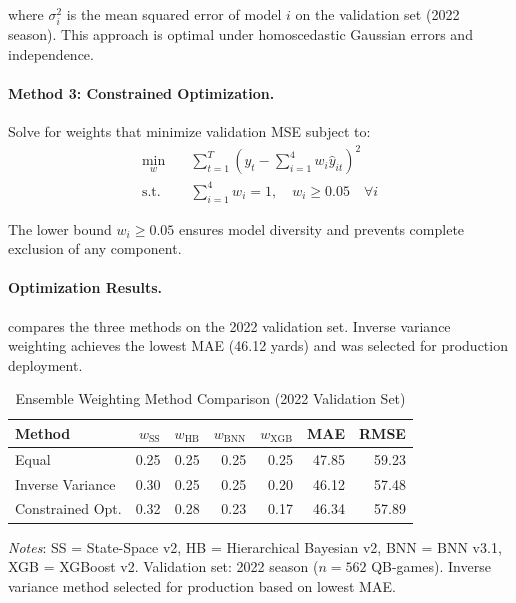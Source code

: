 where $\sigma_i^2$ is the mean squared error of model $i$ on the validation set (2022 season). This approach is optimal under homoscedastic Gaussian errors and independence.

\paragraph{Method 3: Constrained Optimization.}
Solve for weights that minimize validation MSE subject to:
\begin{align}
  \min_{w} \quad & \sum_{t=1}^{T} \left(y_t - \sum_{i=1}^{4} w_i \hat{y}_{it}\right)^2 \\
  \text{s.t.} \quad & \sum_{i=1}^{4} w_i = 1, \quad w_i \ge 0.05 \quad \forall i
\end{align}

The lower bound $w_i \ge 0.05$ ensures model diversity and prevents complete exclusion of any component.

\paragraph{Optimization Results.}
 compares the three methods on the 2022 validation set. Inverse variance weighting achieves the lowest MAE (46.12 yards) and was selected for production deployment.

\begin{table}[htbp]
  \centering
  \caption{Ensemble Weighting Method Comparison (2022 Validation Set)}
  \label{tab:weighting-comparison}
  \begin{tabular}{lrrrrrr}
    \toprule
    \textbf{Method} & \textbf{$w_{\text{SS}}$} & \textbf{$w_{\text{HB}}$} & \textbf{$w_{\text{BNN}}$} & \textbf{$w_{\text{XGB}}$} & \textbf{MAE} & \textbf{RMSE} \\
    \midrule
    Equal & 0.25 & 0.25 & 0.25 & 0.25 & 47.85 & 59.23 \\
    Inverse Variance & 0.30 & 0.25 & 0.25 & 0.20 & 46.12 & 57.48 \\
    Constrained Opt. & 0.32 & 0.28 & 0.23 & 0.17 & 46.34 & 57.89 \\
    \bottomrule
  \end{tabular}
  \vspace{0.5em}
  \begin{flushleft}
    \footnotesize\textit{Notes}: SS = State-Space v2, HB = Hierarchical Bayesian v2, BNN = BNN v3.1, XGB = XGBoost v2. Validation set: 2022 season ($n=562$ QB-games). Inverse variance method selected for production based on lowest MAE.
  \end{flushleft}
\end{table}

